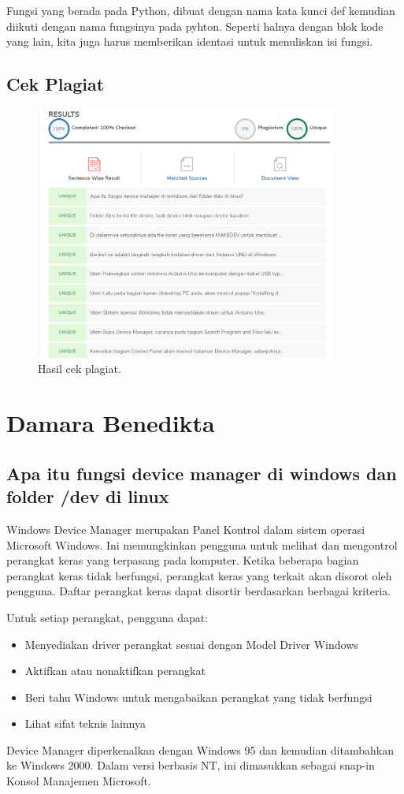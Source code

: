 \hfill \break
Fungsi yang berada pada Python, dibuat dengan nama kata kunci def kemudian diikuti dengan nama fungsinya pada pyhton.
Seperti halnya dengan blok kode yang lain, kita juga harus memberikan identasi untuk menuliskan isi fungsi.

\subsection{Cek Plagiat}
\begin{figure}[H]
	\includegraphics[width=10cm]{figures/5/1174031/Teori/Plagiat.png}
	\centering
	\caption{Hasil cek plagiat.}
\end{figure}
\section{Damara Benedikta}
\subsection{Apa itu fungsi device manager di windows dan folder /dev di linux}
Windows
Device Manager merupakan Panel Kontrol dalam sistem operasi Microsoft Windows. Ini memungkinkan pengguna untuk melihat dan mengontrol perangkat keras yang terpasang pada komputer. Ketika beberapa bagian perangkat keras tidak berfungsi, perangkat keras yang terkait akan disorot oleh pengguna. Daftar perangkat keras dapat disortir berdasarkan berbagai kriteria.

Untuk setiap perangkat, pengguna dapat:
\begin{itemize}
     \item Menyediakan driver perangkat sesuai dengan Model Driver Windows
     \item Aktifkan atau nonaktifkan perangkat
     \item  Beri tahu Windows untuk mengabaikan perangkat yang tidak berfungsi
     \item Lihat sifat teknis lainnya
\end{itemize}
Device Manager diperkenalkan dengan Windows 95 dan kemudian ditambahkan ke Windows 2000. Dalam versi berbasis NT, ini dimasukkan sebagai snap-in Konsol Manajemen Microsoft.

